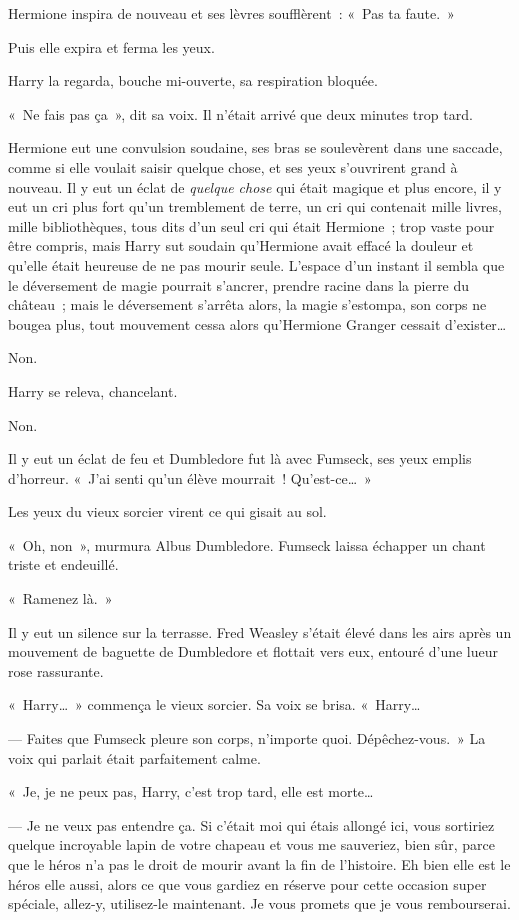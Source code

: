 Hermione inspira de nouveau et ses lèvres soufflèrent~: «~Pas ta faute.~»

Puis elle expira et ferma les yeux.

Harry la regarda, bouche mi-ouverte, sa respiration bloquée.

«~Ne fais pas ça~», dit sa voix.
Il n'était arrivé que deux minutes trop tard.

Hermione eut une convulsion soudaine, ses bras se soulevèrent dans une saccade, comme si elle voulait saisir quelque chose, et ses yeux s'ouvrirent grand à nouveau.
Il y eut un éclat de \emph{quelque chose} qui était magique et plus encore, il y eut un cri plus fort qu'un tremblement de terre, un cri qui contenait mille livres, mille bibliothèques, tous dits d'un seul cri qui était Hermione~; trop vaste pour être compris, mais Harry sut soudain qu'Hermione avait effacé la douleur et qu'elle était heureuse de ne pas mourir seule.
L'espace d'un instant il sembla que le déversement de magie pourrait s'ancrer, prendre racine dans la pierre du château~; mais le déversement s'arrêta alors, la magie s'estompa, son corps ne bougea plus, tout mouvement cessa alors qu'Hermione Granger cessait d'exister…

Non.

Harry se releva, chancelant.

Non.

Il y eut un éclat de feu et Dumbledore fut là avec Fumseck, ses yeux emplis d'horreur.
«~J'ai senti qu'un élève mourrait~!
Qu'est-ce…~»

Les yeux du vieux sorcier virent ce qui gisait au sol.

«~Oh, non~», murmura Albus Dumbledore.
Fumseck laissa échapper un chant triste et endeuillé.

«~Ramenez là.~»

Il y eut un silence sur la terrasse.
Fred Weasley s'était élevé dans les airs après un mouvement de baguette de Dumbledore et flottait vers eux, entouré d'une lueur rose rassurante.

«~Harry…~»
commença le vieux sorcier.
Sa voix se brisa.
«~Harry…

--- Faites que Fumseck pleure son corps, n'importe quoi.
Dépêchez-vous.~»
La voix qui parlait était parfaitement calme.

«~Je, je ne peux pas, Harry, c'est trop tard, elle est morte…

--- Je ne veux pas entendre ça.
Si c'était moi qui étais allongé ici, vous sortiriez quelque incroyable lapin de votre chapeau et vous me sauveriez, bien sûr, parce que le héros n'a pas le droit de mourir avant la fin de l'histoire.
Eh bien elle est le héros elle aussi, alors ce que vous gardiez en réserve pour cette occasion super spéciale, allez-y, utilisez-le maintenant.
Je vous promets que je vous rembourserai.

